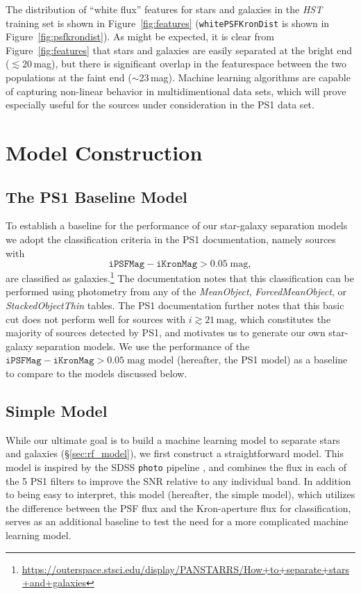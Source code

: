 \documentclass[twocolumn]{aastex62}
\begin{document}
The distribution of ``white flux'' features for stars and galaxies in the \textit{HST} training set is shown in Figure~\ref{fig:features} (\texttt{whitePSFKronDist} is shown in Figure~\ref{fig:psfkrondist}). As might be expected, it is clear from Figure~\ref{fig:features} that stars and galaxies are easily separated at the bright end ($\lesssim 20$\,mag), but there is significant overlap in the featurespace between the two populations at the faint end ($\sim$23\,mag). Machine learning algorithms are capable of capturing non-linear behavior in multidimentional data sets, which will prove especially useful for the sources under consideration in the PS1 data set. 



\section{Model Construction}
\subsection{The PS1 Baseline Model}\label{sec:ps1_model}

To establish a baseline for the performance of our star-galaxy separation models we adopt the classification criteria in the PS1 documentation, namely sources with
$$ \mathtt{iPSFMag} - \mathtt{iKronMag} > 0.05\;\mathrm{mag},$$
are classified as galaxies.\footnote{\url{https://outerspace.stsci.edu/display/PANSTARRS/How+to+separate+stars+and+galaxies}} The documentation notes that this classification can be performed using photometry from any of the \textit{MeanObject}, \textit{ForcedMeanObject}, or \textit{StackedObjectThin} tables. The PS1 documentation further notes that this basic cut does not perform well for sources with $i \gtrsim 21\,\mathrm{mag}$, which constitutes the majority of sources detected by PS1, and motivates us to generate our own star-galaxy separation models. We use the performance of the $\mathtt{iPSFMag} - \mathtt{iKronMag} > 0.05\;\mathrm{mag}$ model (hereafter, the PS1 model) as a baseline to compare to the models discussed below.

\subsection{Simple Model}\label{sec:simple_model}

While our ultimate goal is to build a machine learning model to separate stars and galaxies (\S\ref{sec:rf_model}), we first construct a straightforward model. This model is inspired by the SDSS \texttt{photo} pipeline \citep{Lupton01}, and combines the flux in each of the 5 PS1 filters to improve the SNR relative to any individual band. In addition to being easy to interpret, this model (hereafter, the simple model), which utilizes the difference between the PSF flux and the Kron-aperture flux for classification, serves as an additional baseline to test the need for a more complicated machine learning model. 
\end{document}
